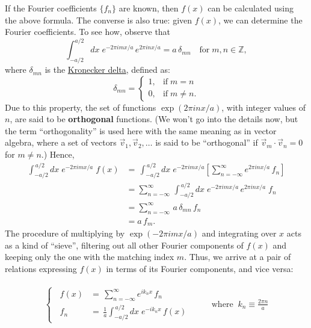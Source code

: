 \documentclass[10pt,a4paper]{article}
\begin{document}
If the Fourier coefficients $\{f_n\}$ are known, then $f(x)$ can be
calculated using the above formula. The converse is also true: given
$f(x)$, we can determine the Fourier coefficients. To see how, observe
that
\begin{equation}
\int_{-a/2}^{a/2} dx \; e^{-2\pi i m x/a}\, e^{2\pi i n x/a} = a\, \delta_{mn}\quad \mathrm{for}\;m, n \in \mathbb{Z},
\end{equation}
where $\delta_{mn}$ is the
\href{http://en.wikipedia.org/wiki/Kronecker_delta}{Kronecker delta},
defined as:
\begin{equation}
\delta_{mn} = \left\{\begin{array}{ll}1, & \textrm{if}\; m = n\\ 0, & \mathrm{if}\;m\ne n.\end{array}\right.
\end{equation}
Due to this property, the set of functions $\exp(2\pi i n x / a)$,
with integer values of $n$, are said to be \textbf{orthogonal}
functions. (We won't go into the details now, but the term
``orthogonality'' is used here with the same meaning as in vector
algebra, where a set of vectors $\vec{v}_1, \vec{v}_2, \dots$ is said
to be ``orthogonal'' if $\vec{v}_m \cdot \vec{v}_n = 0$ for
$m\ne n$.) Hence,
\begin{align}
  \int_{-a/2}^{\,a/2} dx\; e^{-2\pi i m x/a} \;f(x)
  &= \, \int_{-a/2}^{\,a/2} dx\; e^{-2\pi i m x/a} \left[\sum_{n=-\infty}^\infty e^{2\pi i n x/a}\, f_n\right] \\
  &= \sum_{n=-\infty}^\infty \, \int_{-a/2}^{\,a/2} dx\; e^{-2\pi i m x/a}  \, e^{2\pi i n x/a} \;f_n \\
  &= \sum_{n=-\infty}^\infty \, a\, \delta_{mn} \, f_n \\
  &= a \,f_m.
\end{align}
The procedure of multiplying by $\exp(-2\pi i m x/a)$ and integrating
over $x$ acts as a kind of ``sieve'', filtering out all other Fourier
components of $f(x)$ and keeping only the one with the matching index
$m$. Thus, we arrive at a pair of relations expressing $f(x)$ in
terms of its Fourier components, and vice versa:

\begin{framed} \noindent
  \begin{align}
    \begin{aligned}
      \left\{\;\;\begin{array}{rl}f(x) &= \displaystyle \, \sum_{n=-\infty}^\infty e^{i k_n x}\, f_n \\ f_n &= \displaystyle\,\frac{1}{a} \int_{-a/2}^{\,a/2} dx\; e^{-i k_n x}\, f(x)\end{array}\;\;\right. \quad\quad\mathrm{where}\;\; k_n \equiv \frac{2\pi n}{a}
      \label{fseries}
    \end{aligned}
  \end{align}
\end{framed}
\end{document}
